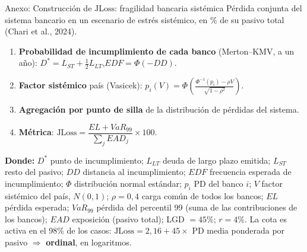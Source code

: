 \documentclass[aspectratio=169]{beamer}
\newcommand{\JLoss}{\mathrm{JLoss}}
\begin{document}
\begin{frame}{Anexo: Construcción de $\JLoss$: fragilidad bancaria sistémica}
\small
Pérdida conjunta del sistema bancario en un escenario de estrés sistémico, en \% de su pasivo total (Chari et al., 2024).
\begin{enumerate}
\item \textbf{Probabilidad de incumplimiento de cada banco} (Merton--KMV, a un año): $D^*=L_{ST}+\tfrac12L_{LT}$,\quad $EDF=\Phi(-DD)$.
\item \textbf{Factor sistémico} país (Vasicek): $p_i(V)=\Phi\!\left(\frac{\Phi^{-1}(p_i)-\rho V}{\sqrt{1-\rho^2}}\right)$.
\item \textbf{Agregación por punto de silla} de la distribución de pérdidas del sistema.
\item \textbf{Métrica}: $\JLoss=\dfrac{EL+VaR_{99}}{\sum_j EAD_j}\times100$.
\end{enumerate}
\vspace{2pt}
{\scriptsize \textbf{Donde:} $D^*$ punto de incumplimiento; $L_{LT}$ deuda de largo plazo emitida; $L_{ST}$ resto del pasivo; $DD$ distancia al incumplimiento; $EDF$ frecuencia esperada de incumplimiento; $\Phi$ distribución normal estándar; $p_i$ PD del banco $i$; $V$ factor sistémico del país, $N(0,1)$; $\rho=0{,}4$ carga común de todos los bancos; $EL$ pérdida esperada; $VaR_{99}$ pérdida del percentil 99 (suma de las contribuciones de los bancos); $EAD$ exposición (pasivo total); LGD $=45\%$; $r=4\%$. La cota es activa en el 98\% de los casos: $\JLoss=2{,}16+45\times$ PD media ponderada por pasivo $\Rightarrow$ \textbf{ordinal}, en logaritmos.\par}
\end{frame}
\end{document}
